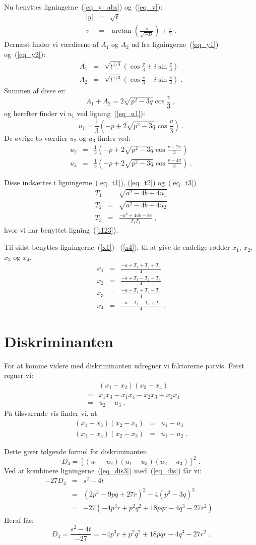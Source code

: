 \documentclass[12pt,oneside,a4paper]{article}
\newcommand{\bas}{\begin{eqnarray*}}
\newcommand{\eas}{\end{eqnarray*}}
\newcommand{\bea}{\begin{eqnarray}}
\newcommand{\eea}{\end{eqnarray}}
\begin{document}
Nu benyttes ligningerne~(\ref{eq_y_abs}) og~(\ref{eq_v}):
\bas
|y| &=& \sqrt{t} \\
v &=& \arctan\left(\frac{s}{\sqrt{-D}}\right) + \frac{\pi}{2} \;.
\eas
Dernæst finder vi værdierne af $A_1$ og $A_2$ ud fra ligningerne~(\ref{eq_y1})
og~(\ref{eq_y2}):
\bas
A_1 &=& \sqrt{t^{1/3}} \left(\cos\frac{v}{3} + i\sin\frac{v}{3}\right) \\
A_2 &=& \sqrt{t^{1/3}} \left(\cos\frac{v}{3} - i\sin\frac{v}{3}\right)  \;.
\eas
Summen af disse er:
\[
    A_1 + A_2 = 2\sqrt{p^2-3q} \cos\frac{v}{3} \;,
\]
og herefter finder vi $u_1$ ved ligning~(\ref{eq_u1}):
\[
    u_1 = \frac{1}{3} \left(-p + 2\sqrt{p^2-3q} \cos\frac{v}{3} \right) \;.
\]
De øvrige to værdier $u_2$ og $u_3$ findes ved:
\bas
u_2 &=& \frac{1}{3} \left(-p + 2\sqrt{p^2-3q} \cos\frac{v+2\pi}{3} \right) \\
u_3 &=& \frac{1}{3} \left(-p + 2\sqrt{p^2-3q} \cos\frac{v+4\pi}{3} \right) \;.
\eas

Disse indsættes i ligningerne~(\ref{eq_t1}), (\ref{eq_t2}) og~(\ref{eq_t3})
\bas
T_1 &=& \sqrt{a^2-4b + 4u_1} \\
T_2 &=& \sqrt{a^2-4b + 4u_2} \\
T_3 &=& \frac{-a^3 + 4ab - 8c}{T_1T_2} \;,
\eas
hvor vi har benyttet ligning~(\ref{t123}).

Til sidst benyttes ligningerne~(\ref{x1})-~(\ref{x4}), til at give de
endelige rødder $x_1$, $x_2$, $x_3$ og $x_4$.
\bas
x_1 &=& \frac{-a + T_1 + T_2 + T_3}4 \\
x_2 &=& \frac{-a + T_1 - T_2 - T_3}4 \\
x_3 &=& \frac{-a - T_1 + T_2 - T_3}4 \\
x_4 &=& \frac{-a - T_1 - T_2 + T_3}4 \;.
\eas

\section{Diskriminanten}
For at komme videre med diskriminanten udregner vi faktorerne parvis.
Først regner vi:
\bea
&& (x_1-x_2)(x_3-x_4) \\
&=& x_1x_3-x_1x_4-x_2x_3+x_2x_4 \\
&=& u_2 - u_3\;.
\eea
På tilsvarende vis finder vi, at 
\bea
(x_1-x_3)(x_2-x_4) &=& u_1 - u_3 \\
(x_1-x_4)(x_2-x_3) &=& u_1 - u_2 \;.
\eea

Dette giver følgende formel for diskriminanten
\[
D_4 = \left[(u_1-u_2)(u_1-u_3)(u_2-u_3)\right]^2 \;.
\]
Ved at kombinere ligningerne~(\ref{eq_dis3}) med~(\ref{eq_dis}) får vi:
\bas
    -27 D_4 &=& s^2 - 4t \\
    &=& (2p^3-9pq+27r)^2 - 4(p^2-3q)^3 \\
    &=& -27(-4p^3r + p^2q^2 + 18pqr - 4q^3 - 27r^2)\;.
\eas
Heraf fås:
\begin{equation}
D_4 = \frac{s^2-4t}{-27} = -4p^3r + p^2q^2 + 18pqr - 4q^3 - 27r^2\;.
\end{equation}
\end{document}
